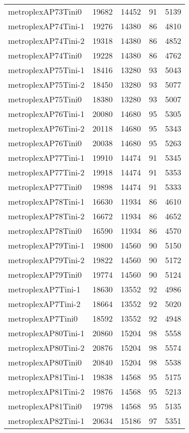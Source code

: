 \begin{tabular}{lrrrr}
metroplexAP73Tini0 & 19682 & 14452 & 91 & 5139 \\
metroplexAP74Tini-1 & 19276 & 14380 & 86 & 4810 \\
metroplexAP74Tini-2 & 19318 & 14380 & 86 & 4852 \\
metroplexAP74Tini0 & 19228 & 14380 & 86 & 4762 \\
metroplexAP75Tini-1 & 18416 & 13280 & 93 & 5043 \\
metroplexAP75Tini-2 & 18450 & 13280 & 93 & 5077 \\
metroplexAP75Tini0 & 18380 & 13280 & 93 & 5007 \\
metroplexAP76Tini-1 & 20080 & 14680 & 95 & 5305 \\
metroplexAP76Tini-2 & 20118 & 14680 & 95 & 5343 \\
metroplexAP76Tini0 & 20038 & 14680 & 95 & 5263 \\
metroplexAP77Tini-1 & 19910 & 14474 & 91 & 5345 \\
metroplexAP77Tini-2 & 19918 & 14474 & 91 & 5353 \\
metroplexAP77Tini0 & 19898 & 14474 & 91 & 5333 \\
metroplexAP78Tini-1 & 16630 & 11934 & 86 & 4610 \\
metroplexAP78Tini-2 & 16672 & 11934 & 86 & 4652 \\
metroplexAP78Tini0 & 16590 & 11934 & 86 & 4570 \\
metroplexAP79Tini-1 & 19800 & 14560 & 90 & 5150 \\
metroplexAP79Tini-2 & 19822 & 14560 & 90 & 5172 \\
metroplexAP79Tini0 & 19774 & 14560 & 90 & 5124 \\
metroplexAP7Tini-1 & 18630 & 13552 & 92 & 4986 \\
metroplexAP7Tini-2 & 18664 & 13552 & 92 & 5020 \\
metroplexAP7Tini0 & 18592 & 13552 & 92 & 4948 \\
metroplexAP80Tini-1 & 20860 & 15204 & 98 & 5558 \\
metroplexAP80Tini-2 & 20876 & 15204 & 98 & 5574 \\
metroplexAP80Tini0 & 20840 & 15204 & 98 & 5538 \\
metroplexAP81Tini-1 & 19838 & 14568 & 95 & 5175 \\
metroplexAP81Tini-2 & 19876 & 14568 & 95 & 5213 \\
metroplexAP81Tini0 & 19798 & 14568 & 95 & 5135 \\
metroplexAP82Tini-1 & 20634 & 15186 & 97 & 5351 \\

\end{tabular}

